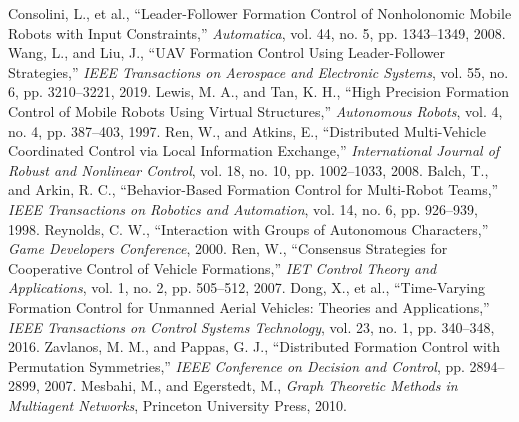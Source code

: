 \documentclass{article}
\begin{document}
\begin{thebibliography}{10}

 Consolini, L., et al., ``Leader-Follower Formation Control of Nonholonomic Mobile Robots with Input Constraints,'' \textit{Automatica}, vol. 44, no. 5, pp. 1343--1349, 2008.
 Wang, L., and Liu, J., ``UAV Formation Control Using Leader-Follower Strategies,'' \textit{IEEE Transactions on Aerospace and Electronic Systems}, vol. 55, no. 6, pp. 3210--3221, 2019.
 Lewis, M. A., and Tan, K. H., ``High Precision Formation Control of Mobile Robots Using Virtual Structures,'' \textit{Autonomous Robots}, vol. 4, no. 4, pp. 387--403, 1997.
 Ren, W., and Atkins, E., ``Distributed Multi-Vehicle Coordinated Control via Local Information Exchange,'' \textit{International Journal of Robust and Nonlinear Control}, vol. 18, no. 10, pp. 1002--1033, 2008.
 Balch, T., and Arkin, R. C., ``Behavior-Based Formation Control for Multi-Robot Teams,'' \textit{IEEE Transactions on Robotics and Automation}, vol. 14, no. 6, pp. 926--939, 1998.
 Reynolds, C. W., ``Interaction with Groups of Autonomous Characters,'' \textit{Game Developers Conference}, 2000.
 Ren, W., ``Consensus Strategies for Cooperative Control of Vehicle Formations,'' \textit{IET Control Theory and Applications}, vol. 1, no. 2, pp. 505--512, 2007.
 Dong, X., et al., ``Time-Varying Formation Control for Unmanned Aerial Vehicles: Theories and Applications,'' \textit{IEEE Transactions on Control Systems Technology}, vol. 23, no. 1, pp. 340--348, 2016.
 Zavlanos, M. M., and Pappas, G. J., ``Distributed Formation Control with Permutation Symmetries,'' \textit{IEEE Conference on Decision and Control}, pp. 2894--2899, 2007.
 Mesbahi, M., and Egerstedt, M., \textit{Graph Theoretic Methods in Multiagent Networks}, Princeton University Press, 2010.



\end{thebibliography}
\end{document}
